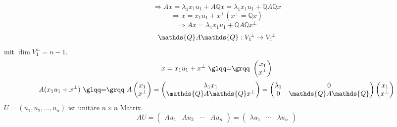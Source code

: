 \documentclass[../ana2.tex]{subfiles}
\begin{document}
\begin{bew}
    \[ \Rightarrow Ax = \lambda_1 x_1 u_1 + A\mathds{Q}x
    = \lambda_1 x_1 u_1 + \mathds{Q}A\mathds{Q}x \]
    \[ \Rightarrow x = x_1 u_1 + x^\bot (x^\bot = \mathds{Q}x) \]
    \[ \Rightarrow Ax = \lambda_1 x_1 u_1 + \mathds{Q}A\mathds{Q} x^\bot \]
    \[ \abb{\mathds{Q} A \mathds{Q}}{V_1^\bot}{V_1^\bot} \]
    mit \(\dim V_1^\bot = n-1\).
    \[ x = x_1 u_1 + x^\bot \text{ \gqq{\(=\)} } 
    \begin{pmatrix} x_1 \\ x^\bot \end{pmatrix} \]
    \[ A(x_1u_1+x^\bot) \text{ \gqq{\(=\)} } A \begin{pmatrix}
        x_1\\
        x^\bot
    \end{pmatrix} = \begin{pmatrix}
        \lambda_1x_1\\
        \mathds{Q}A\mathds{Q}x^\bot
    \end{pmatrix} = \begin{pmatrix}
        \lambda_1 & 0\\
        0 & \mathds{Q}A\mathds{Q}
    \end{pmatrix} \begin{pmatrix}
        x_1\\
        x^\bot
    \end{pmatrix} \]
    \( U = (u_1, u_2, \ldots, u_n) \) ist unitäre \(n \times n\) Matrix.
    \[ AU = \begin{pmatrix}
        Au_1 & Au_2 & \cdots & A u_n
    \end{pmatrix} 
    = \begin{pmatrix}
        \lambda u_1 & \cdots & \lambda u_n
    \end{pmatrix} \]
\end{bew}
\end{document}

